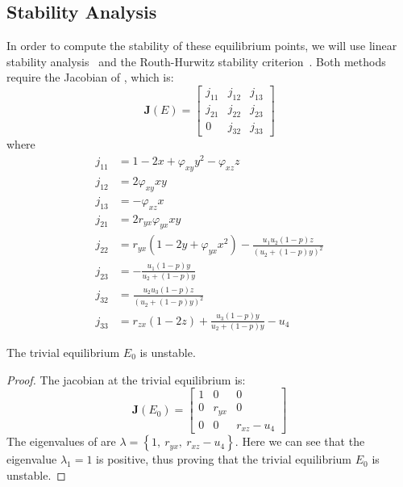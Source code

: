 \subsection{Stability Analysis}\label{subsec:stability-analysis}
In order to compute the stability of these equilibrium points, we will use linear stability analysis~\cite{Strogatz9780813349107} and the Routh-Hurwitz stability criterion~\cite{YANG2002615621}. Both methods require the Jacobian of , which is:
\begin{equation}\label{matrix:jacobian-model}
    \textbf{J}\left(E\right) = \begin{bmatrix}
        j_{11} & j_{12} & j_{13}\\
        j_{21} & j_{22} & j_{23}\\
        0 & j_{32} & j_{33}
    \end{bmatrix}
\end{equation}
where
\begin{align*}
    j_{11} &= 1-2x+\varphi_{xy}y^2-\varphi_{xz}z\\
    j_{12} &= 2\varphi_{xy}xy\\
    j_{13} &= -\varphi_{xz}x\\
    j_{21} &= 2r_{yx}\varphi_{yx}xy\\
    j_{22} &= r_{yx}\left(1-2y+\varphi_{yx}x^2\right)-\frac{u_1u_2\left(1-p\right)z}{\left(u_2+\left(1-p\right)y\right)^2}\\
    j_{23} &= -\frac{u_1\left(1-p\right)y}{u_2+\left(1-p\right)y}\\
    j_{32} &= \frac{u_2u_3\left(1-p\right)z}{\left(u_2+\left(1-p\right)y\right)^2}\\
    j_{33} &= r_{zx}\left(1-2z\right)+\frac{u_3\left(1-p\right)y}{u_2+\left(1-p\right)y}-u_4
\end{align*}

\begin{theorem}\label{thm:trivial-stability}
    The trivial equilibrium $E_0$ is unstable.
\end{theorem}
\begin{proof}
    The jacobian at the trivial equilibrium is:
    \begin{equation}\label{matrix:jacobian-trivial}
        \textbf{J}\left(E_0\right) = \begin{bmatrix}
            1 & 0 & 0\\
            0 & r_{yx} & 0\\
            0 & 0 & r_{xz}-u_4
        \end{bmatrix}
    \end{equation}
    The eigenvalues of  are $\lambda=\left\{1,\ r_{yx},\ r_{xz}-u_4\right\}$. Here we can see that the eigenvalue $\lambda_1=1$ is positive, thus proving that the trivial equilibrium $E_0$ is unstable.
\end{proof}

